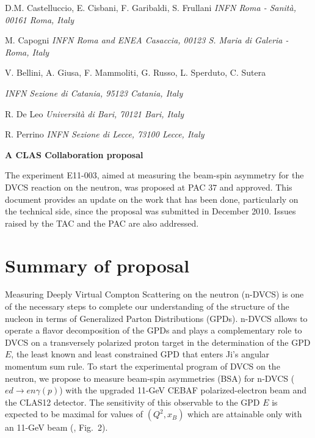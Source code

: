 \documentclass[12pt,oneside]{article}
\begin{document}
\vskip 0.2cm
\centerline{D.M. Castelluccio, E. Cisbani, F. Garibaldi, S. Frullani \it INFN Roma - Sanit\`a, 00161 Roma, Italy}
\vskip 0.2cm
\centerline{M. Capogni \it INFN Roma and ENEA Casaccia, 00123 S. Maria di Galeria - Roma, Italy}
\vskip 0.2cm
\centerline{V. Bellini, A. Giusa, F. Mammoliti, G. Russo, L. Sperduto, C. Sutera}
\centerline{\it INFN Sezione di Catania, 95123 Catania, Italy}
\vskip 0.2cm
\centerline{R. De Leo \it Universit\`a di Bari, 70121 Bari, Italy}
\vskip 0.2cm
\centerline{R. Perrino \it INFN Sezione di Lecce, 73100 Lecce, Italy}
\vskip 0.5cm
{\large{\centerline{\bf A CLAS Collaboration proposal}}
\newpage
\abstract{}
The experiment E11-003, aimed at measuring the beam-spin asymmetry for the DVCS reaction on the neutron, was proposed at PAC 37 and approved. This document provides an update on the work that has been done, particularly on the technical side, since the proposal was submitted in December 2010. Issues raised by the TAC and the PAC are also addressed. 

\setcounter{page}{1}
\section{Summary of proposal}
Measuring Deeply Virtual Compton Scattering on the neutron (n-DVCS) is one of the necessary steps to complete our understanding of the structure of the nucleon in terms of Generalized Parton Distributions (GPDs). n-DVCS allows to operate a flavor decomposition of the GPDs and plays a complementary role to DVCS on a transversely polarized proton target in the determination of the GPD $E$, the least known and least constrained GPD that enters Ji's angular momentum sum rule. To start the experimental program of DVCS on the neutron, we propose to measure beam-spin asymmetries (BSA) for n-DVCS ($ed\to en\gamma(p)$) with the upgraded 11-GeV CEBAF polarized-electron beam and the CLAS12 detector. The sensitivity of this observable to the GPD $E$ is expected to be maximal for values of $(Q^2, x_B)$ which are attainable only with an 11-GeV beam (\cite{proposal}, Fig.~2). 

}
\end{document}
